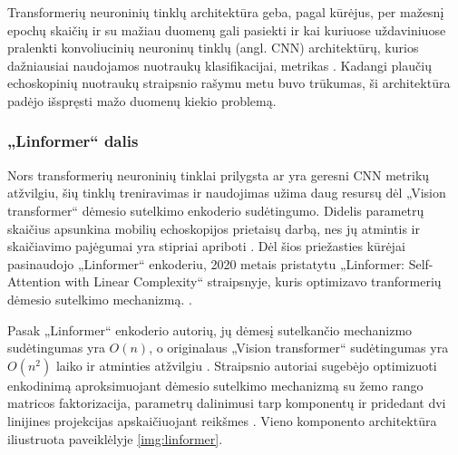 \documentclass[fleqn]{VUMIFKompMagistrinis}
\begin{document}
\par
Transformerių neuroninių tinklų architektūra geba, pagal kūrėjus, per mažesnį epochų skaičių ir su mažiau duomenų gali pasiekti ir kai kuriuose uždaviniuose pralenkti konvoliucinių neuroninų tinklų (angl. CNN) architektūrų, kurios dažniausiai naudojamos nuotraukų klasifikacijai, metrikas \cite{dosovitskiy2021image}. Kadangi plaučių echoskopinių nuotraukų straipsnio rašymu metu buvo trūkumas, ši architektūra padėjo išspręsti mažo duomenų kiekio problemą. \cite{PAY21}   
\subsubsection{„Linformer“ dalis}
\label{sec:linformer}
Nors transformerių neuroninių tinklai prilygsta ar yra geresni CNN metrikų atžvilgiu, šių tinklų treniravimas ir naudojimas užima daug resursų dėl „Vision transformer“ dėmesio sutelkimo enkoderio sudėtingumo. Didelis parametrų skaičius apsunkina mobilių echoskopijos prietaisų darbą, nes jų atmintis ir skaičiavimo pajėgumai yra stipriai apriboti \cite{PAY21}. Dėl šios priežasties kūrėjai pasinaudojo „Linformer“ enkoderiu, 2020 metais pristatytu „Linformer: Self-Attention with Linear Complexity“ straipsnyje, kuris optimizavo tranformerių dėmesio sutelkimo mechanizmą. \cite{PAY21, wang2020linformer}.
\par
Pasak „Linformer“ enkoderio autorių, jų dėmesį sutelkančio mechanizmo sudėtingumas yra \( O(n) \), o originalaus „Vision transformer“ sudėtingumas yra \( O(n^2) \) laiko ir atminties atžvilgiu \cite{wang2020linformer}. Straipsnio autoriai sugebėjo optimizuoti enkodinimą aproksimuojant dėmesio sutelkimo mechanizmą su žemo rango matricos faktorizacija, parametrų dalinimusi tarp komponentų ir pridedant dvi linijines projekcijas apskaičiuojant reikšmes \cite{wang2020linformer}. Vieno komponento architektūra iliustruota paveiklėlyje \ref{img:linformer}.
\end{document}

